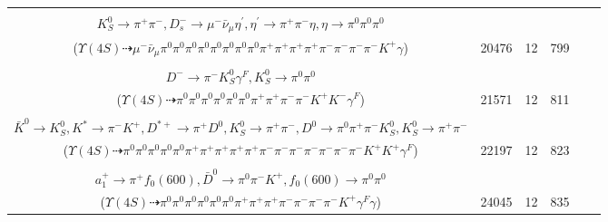 \documentclass[landscape]{article}
\newcounter{rownumbers}
\newcommand\rn{\stepcounter{rownumbers}\arabic{rownumbers}}
\newcommand{\EOLP}{\\ \hline} %
\newcommand{\topoTags}[1]{#1} %
\begin{document}
\begin{longtable}{clcccc}
\rn & \makecell[l]{ $ 
\Upsilon(4S) \rightarrow B^{0} \bar{B}^{0} ,
B^{0} \rightarrow \pi^{-} K_{0}^{*+} ,
\bar{B}^{0} \rightarrow \pi^{0} \pi^{+} D^{0} D_{s}^{*-} ,
K_{0}^{*+} \rightarrow \pi^{0} K^{+} ,
D^{0} \rightarrow \pi^{0} \pi^{0} \pi^{0} \pi^{+} \pi^{-} K_{S}^{0} ,
D_{s}^{*-} \rightarrow D_{s}^{-} \gamma ,
$ \\ $
K_{S}^{0} \rightarrow \pi^{+} \pi^{-} ,
D_{s}^{-} \rightarrow \mu^{-} \bar{\nu}_{\mu} \eta^{\prime} ,
\eta^{\prime} \rightarrow \pi^{+} \pi^{-} \eta ,
\eta \rightarrow \pi^{0} \pi^{0} \pi^{0} 
$ \\ ($
\Upsilon(4S) \dashrightarrow \mu^{-} \bar{\nu}_{\mu} \pi^{0} \pi^{0} \pi^{0} \pi^{0} \pi^{0} \pi^{0} \pi^{0} \pi^{0} \pi^{+} \pi^{+} \pi^{+} \pi^{+} \pi^{-} \pi^{-} \pi^{-} \pi^{-} K^{+} \gamma 
$) } & \topoTags{20476 & }12 & 799 \EOLP

\rn & \makecell[l]{ $ 
\Upsilon(4S) \rightarrow B^{0} \bar{B}^{0} ,
B^{0} \rightarrow \pi^{0} \pi^{+} \rho^{-} K^{+} D^{*-} ,
\bar{B}^{0} \rightarrow \rho^{+} K^{-} ,
\rho^{-} \rightarrow \pi^{0} \pi^{-} ,
D^{*-} \rightarrow \pi^{0} D^{-} ,
\rho^{+} \rightarrow \pi^{0} \pi^{+} ,
$ \\ $
D^{-} \rightarrow \pi^{-} K_{S}^{0} \gamma^{F} ,
K_{S}^{0} \rightarrow \pi^{0} \pi^{0} 
$ \\ ($
\Upsilon(4S) \dashrightarrow \pi^{0} \pi^{0} \pi^{0} \pi^{0} \pi^{0} \pi^{0} \pi^{+} \pi^{+} \pi^{-} \pi^{-} K^{+} K^{-} \gamma^{F} 
$) } & \topoTags{21571 & }12 & 811 \EOLP

\rn & \makecell[l]{ $ 
\Upsilon(4S) \rightarrow B^{0} \bar{B}^{0} ,
B^{0} \rightarrow \pi^{-} K^{*}(1680)^{+} ,
\bar{B}^{0} \rightarrow \pi^{-} \eta \omega \bar{K}^{0} K^{*} D^{*+} ,
K^{*}(1680)^{+} \rightarrow \pi^{0} K^{+} \gamma^{F} ,
\eta \rightarrow \pi^{0} \pi^{0} \pi^{0} ,
\omega \rightarrow \pi^{+} \pi^{-} ,
$ \\ $
\bar{K}^{0} \rightarrow K_{S}^{0} ,
K^{*} \rightarrow \pi^{-} K^{+} ,
D^{*+} \rightarrow \pi^{+} D^{0} ,
K_{S}^{0} \rightarrow \pi^{+} \pi^{-} ,
D^{0} \rightarrow \pi^{0} \pi^{+} \pi^{-} K_{S}^{0} ,
K_{S}^{0} \rightarrow \pi^{+} \pi^{-} 
$ \\ ($
\Upsilon(4S) \dashrightarrow \pi^{0} \pi^{0} \pi^{0} \pi^{0} \pi^{0} \pi^{+} \pi^{+} \pi^{+} \pi^{+} \pi^{+} \pi^{-} \pi^{-} \pi^{-} \pi^{-} \pi^{-} \pi^{-} \pi^{-} K^{+} K^{+} \gamma^{F} 
$) } & \topoTags{22197 & }12 & 823 \EOLP

\rn & \makecell[l]{ $ 
\Upsilon(4S) \rightarrow B^{0} \bar{B}^{0} ,
B^{0} \rightarrow \pi^{0} \pi^{-} \rho^{+} \omega \bar{D}^{*0} ,
\bar{B}^{0} \rightarrow \pi^{-} a_{1}^{+} \gamma^{F} ,
\rho^{+} \rightarrow \pi^{0} \pi^{+} ,
\omega \rightarrow \pi^{0} \pi^{+} \pi^{-} ,
\bar{D}^{*0} \rightarrow \bar{D}^{0} \gamma ,
$ \\ $
a_{1}^{+} \rightarrow \pi^{+} f_{0}(600) ,
\bar{D}^{0} \rightarrow \pi^{0} \pi^{-} K^{+} ,
f_{0}(600) \rightarrow \pi^{0} \pi^{0} 
$ \\ ($
\Upsilon(4S) \dashrightarrow \pi^{0} \pi^{0} \pi^{0} \pi^{0} \pi^{0} \pi^{0} \pi^{+} \pi^{+} \pi^{+} \pi^{-} \pi^{-} \pi^{-} \pi^{-} K^{+} \gamma^{F} \gamma 
$) } & \topoTags{24045 & }12 & 835 \EOLP


\end{longtable}
\end{document}
